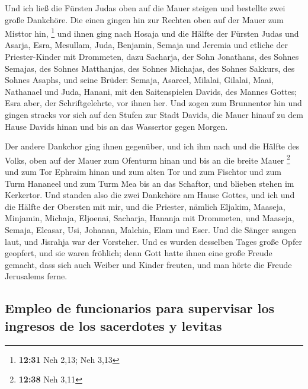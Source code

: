  Und ich ließ die Fürsten Judas oben auf die Mauer
steigen und bestellte zwei große Dankchöre. Die einen gingen hin zur
Rechten oben auf der Mauer zum Misttor hin, \footnote{\textbf{12:31} Neh
  2,13; Neh 3,13}  und ihnen ging nach Hosaja und die
Hälfte der Fürsten Judas  und Asarja, Esra, Mesullam,
 Juda, Benjamin, Semaja und Jeremia  und
etliche der Priester-Kinder mit Drommeten, dazu Sacharja, der Sohn
Jonathans, des Sohnes Semajas, des Sohnes Matthanjas, des Sohnes
Michajas, des Sohnes Sakkurs, des Sohnes Asaphs,  und
seine Brüder: Semaja, Asareel, Milalai, Gilalai, Maai, Nathanael und
Juda, Hanani, mit den Saitenspielen Davids, des Mannes Gottes; Esra
aber, der Schriftgelehrte, vor ihnen her.  Und zogen zum
Brunnentor hin und gingen stracks vor sich auf den Stufen zur Stadt
Davids, die Mauer hinauf zu dem Hause Davids hinan und bis an das
Wassertor gegen Morgen.

 Der andere Dankchor ging ihnen gegenüber, und ich ihm
nach und die Hälfte des Volks, oben auf der Mauer zum Ofenturm hinan und
bis an die breite Mauer \footnote{\textbf{12:38} Neh 3,11}
 und zum Tor Ephraim hinan und zum alten Tor und zum
Fischtor und zum Turm Hananeel und zum Turm Mea bis an das Schaftor, und
blieben stehen im Kerkertor.  Und standen also die zwei
Dankchöre am Hause Gottes, und ich und die Hälfte der Obersten mit mir,
 und die Priester, nämlich Eljakim, Maaseja, Minjamin,
Michaja, Eljoenai, Sacharja, Hananja mit Drommeten,  und
Maaseja, Semaja, Eleasar, Usi, Johanan, Malchia, Elam und Eser. Und die
Sänger sangen laut, und Jisrahja war der Vorsteher.  Und
es wurden desselben Tages große Opfer geopfert, und sie waren fröhlich;
denn Gott hatte ihnen eine große Freude gemacht, dass sich auch Weiber
und Kinder freuten, und man hörte die Freude Jerusalems ferne.

\hypertarget{empleo-de-funcionarios-para-supervisar-los-ingresos-de-los-sacerdotes-y-levitas}{%
\subsection{Empleo de funcionarios para supervisar los ingresos de los
sacerdotes y
levitas}\label{empleo-de-funcionarios-para-supervisar-los-ingresos-de-los-sacerdotes-y-levitas}}

